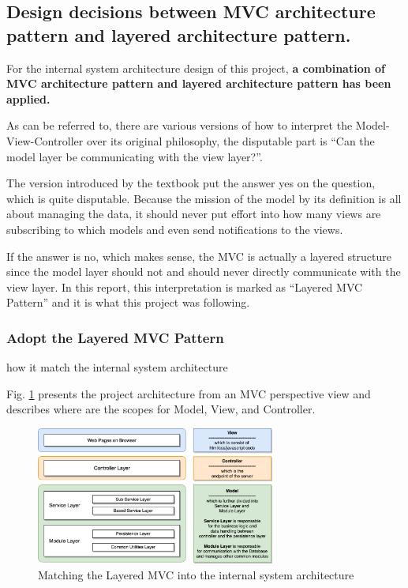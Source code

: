 \documentclass[conference]{IEEEtran}
\begin{document}
\subsection{Design decisions between MVC architecture pattern and layered architecture pattern.}
\label{sec:1.3}


For the internal system architecture design of this project,
\textbf{a combination of MVC architecture pattern and layered architecture pattern has been applied.}

As can be referred to\cite{mvc_versions}, there are various versions of how to interpret the Model-View-Controller over its original philosophy,
the disputable part is \textquotedblleft Can the model layer be communicating with the view layer?\textquotedblright .

The version introduced by the textbook\cite{textbook} put the answer yes on the question, which is quite disputable.
Because the mission of the model by its definition is all about managing the data,
it should never put effort into how many views are subscribing to which models and even send notifications to the views.

If the answer is no, which makes sense, the MVC is actually a layered structure\cite{mvc_2,mvc_3}
since the model layer should not and should never directly communicate with the view layer.
In this report, this interpretation is marked as \textquotedblleft Layered MVC Pattern\textquotedblright
and it is what this project was following.

\subsubsection{\textbf{Adopt the Layered MVC Pattern}} how it match the internal system architecture

Fig. \ref{fig:mvc-arch} presents the project architecture from an MVC perspective view
and describes where are the scopes for Model, View, and Controller.

\begin{figure}[!ht]
	\centering
	\includegraphics[width=0.7\textwidth]{mvc-arch.png}
	\caption{Matching the Layered MVC into the internal system architecture}
	\label{fig:mvc-arch}
\end{figure}
\end{document}
